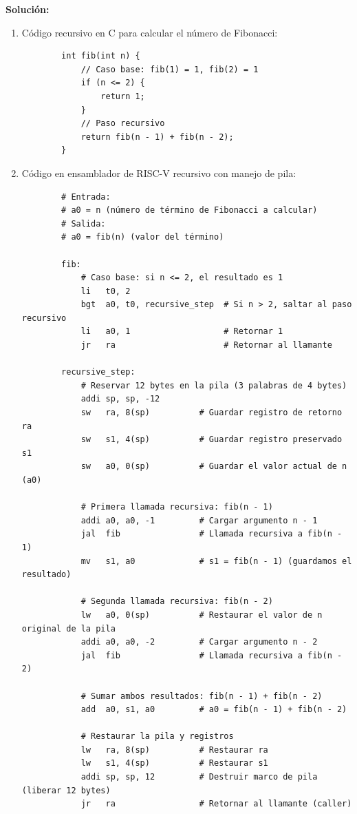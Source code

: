 \documentclass[letterpaper,12pt]{article}
\begin{document}
\begin{enumerate}
    \color{solcolor}
    \textbf{Solución:}
    \begin{enumerate}[label=\alph*)]
        \item Código recursivo en C para calcular el número de Fibonacci:
        \begin{verbatim}
        int fib(int n) {
            // Caso base: fib(1) = 1, fib(2) = 1
            if (n <= 2) {
                return 1;
            }
            // Paso recursivo
            return fib(n - 1) + fib(n - 2);
        }
        \end{verbatim}
        
        \item Código en ensamblador de RISC-V recursivo con manejo de pila:
        \begin{verbatim}
        # Entrada:
        # a0 = n (número de término de Fibonacci a calcular)
        # Salida:
        # a0 = fib(n) (valor del término)

        fib:
            # Caso base: si n <= 2, el resultado es 1
            li   t0, 2
            bgt  a0, t0, recursive_step  # Si n > 2, saltar al paso recursivo
            li   a0, 1                   # Retornar 1
            jr   ra                      # Retornar al llamante

        recursive_step:
            # Reservar 12 bytes en la pila (3 palabras de 4 bytes)
            addi sp, sp, -12
            sw   ra, 8(sp)          # Guardar registro de retorno ra
            sw   s1, 4(sp)          # Guardar registro preservado s1
            sw   a0, 0(sp)          # Guardar el valor actual de n (a0)

            # Primera llamada recursiva: fib(n - 1)
            addi a0, a0, -1         # Cargar argumento n - 1
            jal  fib                # Llamada recursiva a fib(n - 1)
            mv   s1, a0             # s1 = fib(n - 1) (guardamos el resultado)

            # Segunda llamada recursiva: fib(n - 2)
            lw   a0, 0(sp)          # Restaurar el valor de n original de la pila
            addi a0, a0, -2         # Cargar argumento n - 2
            jal  fib                # Llamada recursiva a fib(n - 2)

            # Sumar ambos resultados: fib(n - 1) + fib(n - 2)
            add  a0, s1, a0         # a0 = fib(n - 1) + fib(n - 2)

            # Restaurar la pila y registros
            lw   ra, 8(sp)          # Restaurar ra
            lw   s1, 4(sp)          # Restaurar s1
            addi sp, sp, 12         # Destruir marco de pila (liberar 12 bytes)
            jr   ra                 # Retornar al llamante (caller)
        \end{verbatim}
    \end{enumerate}
    \color{black}


\end{enumerate}
\end{document}
